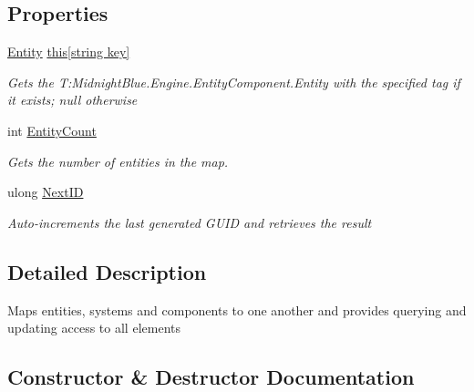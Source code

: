 \subsection*{Properties}
\begin{DoxyCompactItemize}
\item 
\hyperlink{class_midnight_blue_1_1_engine_1_1_entity_component_1_1_entity}{Entity} \hyperlink{class_midnight_blue_1_1_engine_1_1_entity_component_1_1_entity_map_aa5372ec92d0acebba09e3571024ea5cc}{this\mbox{[}string key\mbox{]}}
\begin{DoxyCompactList}\small\item\em Gets the T\+:\+Midnight\+Blue.\+Engine.\+Entity\+Component.\+Entity with the specified tag if it exists; null otherwise \end{DoxyCompactList}\item 
int \hyperlink{class_midnight_blue_1_1_engine_1_1_entity_component_1_1_entity_map_aa57011ecf142d7873d4f7844a84f3e5c}{Entity\+Count}
\begin{DoxyCompactList}\small\item\em Gets the number of entities in the map. \end{DoxyCompactList}\item 
ulong \hyperlink{class_midnight_blue_1_1_engine_1_1_entity_component_1_1_entity_map_a75f356cbbfe6a0ca5f3ec33ff7313cb6}{Next\+ID}
\begin{DoxyCompactList}\small\item\em Auto-\/increments the last generated G\+U\+ID and retrieves the result \end{DoxyCompactList}\end{DoxyCompactItemize}


\subsection{Detailed Description}
Maps entities, systems and components to one another and provides querying and updating access to all elements 



\subsection{Constructor \& Destructor Documentation}
\hypertarget{class_midnight_blue_1_1_engine_1_1_entity_component_1_1_entity_map_ad242ca713249280c914742d68f3c8ea4}{}\label{class_midnight_blue_1_1_engine_1_1_entity_component_1_1_entity_map_ad242ca713249280c914742d68f3c8ea4} 
